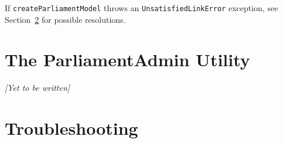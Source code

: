 If \verb|createParliamentModel| throws an \verb|UnsatisfiedLinkError| exception, see Section~\ref{section-troubleshooting} for possible resolutions.

\section{The ParliamentAdmin Utility}
\label{section-parliamentadmin-utility}

\emph{[Yet to be written]}

\section{Troubleshooting}
\label{section-troubleshooting}

